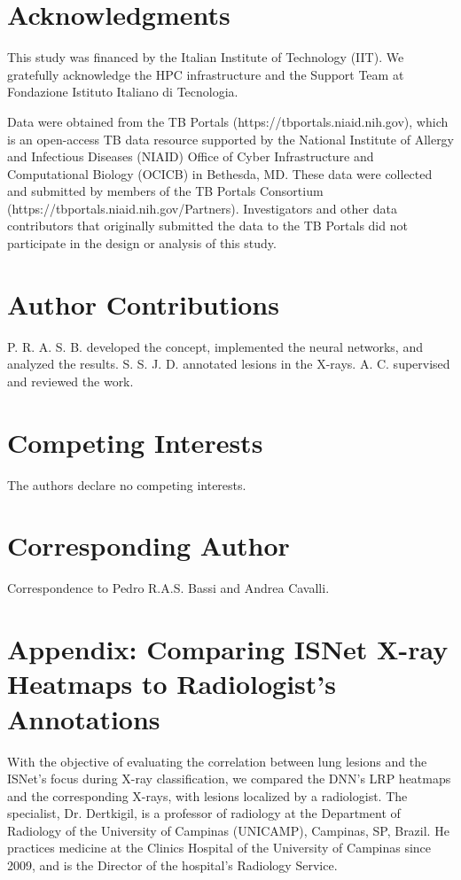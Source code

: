 \documentclass[fleqn,10pt]{wlscirep}
\begin{document}
{

\section*{Acknowledgments}
This study was financed by the Italian Institute of Technology (IIT). We gratefully acknowledge the HPC infrastructure and the Support Team at Fondazione Istituto Italiano di Tecnologia.

Data were obtained from the TB Portals (https://tbportals.niaid.nih.gov), which is an
open-access TB data resource supported by the National Institute of Allergy and
Infectious Diseases (NIAID) Office of Cyber Infrastructure and Computational Biology
(OCICB) in Bethesda, MD. These data were collected and submitted by members of the
TB Portals Consortium (https://tbportals.niaid.nih.gov/Partners). Investigators and other
data contributors that originally submitted the data to the TB Portals did not participate
in the design or analysis of this study.


\section*{Author Contributions}
P. R. A. S. B. developed the concept, implemented the neural networks, and analyzed the results. S. S. J. D. annotated lesions in the X-rays. A. C. supervised and reviewed the work.

\section*{Competing Interests}
The authors declare no competing interests.

\section*{Corresponding Author}
Correspondence to Pedro R.A.S. Bassi and Andrea Cavalli.


\appendix
\section{Appendix: Comparing ISNet X-ray Heatmaps to Radiologist's Annotations}
\label{radiologistAnalysis}

With the objective of evaluating the correlation between lung lesions and the ISNet's focus during X-ray classification, we compared the DNN's LRP heatmaps and the corresponding X-rays, with lesions localized by a radiologist. The specialist, Dr. Dertkigil, is a professor of radiology at the Department of Radiology of the University of Campinas (UNICAMP), Campinas, SP, Brazil. He practices medicine at the Clinics Hospital of the University of Campinas since 2009, and is the Director of the hospital's Radiology Service.

}
\end{document}
